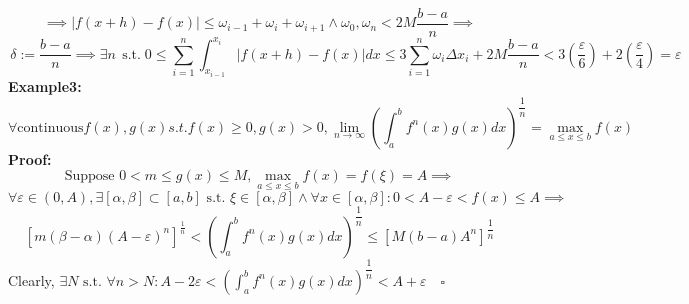 \documentclass{article}
\newcommand{\st}{\mbox{ s.t. }}
\newcommand{\0}{{\bf{0}}}
\begin{document}
$$\implies\left|f\left(x+h\right)-f\left(x\right)\right|\leq \omega_{i-1}+\omega_{i}+\omega_{i+1}\land\omega_{0},\omega_{n}<2M\frac{b-a}{n}\implies$$
$$\,\delta:=\frac{b-a}{n}\implies\exists n\,\;\text{s.t.}\;0\leq\sum_{i=1}^{n}\int_{x_{i-1}}^{x_{i}}\left|f\left(x+h\right)-f\left(x\right)\right|dx\leq3\sum_{i=1}^{n}\omega_{i}\Delta x_{i}+2M\frac{b-a}{n}<3\left(\frac{\varepsilon}{6}\right)+2\left(\frac{\varepsilon}{4}\right)=\varepsilon$$
\textbf{Example3:}
$$\forall \text{continuous}f\left(x\right),g\left(x\right)s.t.f\left(x\right)\geq0,g\left(x\right)>0,\lim_{n\to\infty}\left(\int_{a}^{b}f^n(x)g(x)dx\right)^{\dfrac{1}{n}}=\max_{a\le x\le b}f(x)$$
\textbf{Proof:}
$$\mbox{Suppose }0<m\le g(x)\le M,\max_{a\le x\le b}f(x)=f(\xi)=A\implies$$
$$\forall\varepsilon\in(0,A),\exists[\alpha,\beta]\subset\left[a,b\right]\st\xi\in[\alpha,\beta]\land\forall x\in[\alpha,\beta]:0<A-\varepsilon <f\left(x\right)\leq A\implies$$
$$\left[m(\beta-\alpha)(A-\varepsilon)^n\right]^\frac{1}{n}<\left(\int_a^bf^n(x)g(x)dx\right)^{\dfrac{1}{n}}\le\left[M(b-a)A^{n}\right]^{\dfrac{1}{n}}$$
Clearly, $\exists N\st\forall n>N:A-2\varepsilon<\left(\int_a^bf^n(x)g(x)dx\right)^{\dfrac{1}{n}}<A+\varepsilon\quad\square$
\end{document}

